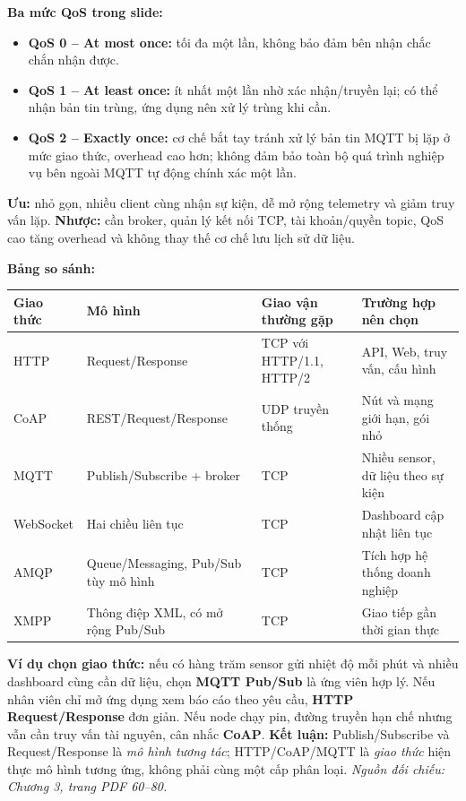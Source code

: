 \documentclass[12pt,a4paper]{article}
\newcommand{\nguon}[1]{{\small\itshape\color{navy}Nguồn đối chiếu: #1.}}
\begin{document}
\textbf{Ba mức QoS trong slide:}
\begin{itemize}
\item \textbf{QoS 0 -- At most once:} tối đa một lần, không bảo đảm bên nhận chắc chắn nhận được.
\item \textbf{QoS 1 -- At least once:} ít nhất một lần nhờ xác nhận/truyền lại; có thể nhận bản tin trùng, ứng dụng nên xử lý trùng khi cần.
\item \textbf{QoS 2 -- Exactly once:} cơ chế bắt tay tránh xử lý bản tin MQTT bị lặp ở mức giao thức, overhead cao hơn; không đảm bảo toàn bộ quá trình nghiệp vụ bên ngoài MQTT tự động chính xác một lần.
\end{itemize}
\textbf{Ưu:} nhỏ gọn, nhiều client cùng nhận sự kiện, dễ mở rộng telemetry và giảm truy vấn lặp. \textbf{Nhược:} cần broker, quản lý kết nối TCP, tài khoản/quyền topic, QoS cao tăng overhead và không thay thế cơ chế lưu lịch sử dữ liệu.

\textbf{Bảng so sánh:}
\begin{center}\footnotesize
\begin{tabularx}{\linewidth}{p{2cm}p{2.8cm}p{2.1cm}X}
\toprule
Giao thức & Mô hình & Giao vận thường gặp & Trường hợp nên chọn\\
\midrule
HTTP & Request/Response & TCP với HTTP/1.1, HTTP/2 & API, Web, truy vấn, cấu hình\\
CoAP & REST/Request/Response & UDP truyền thống & Nút và mạng giới hạn, gói nhỏ\\
MQTT & Publish/Subscribe + broker & TCP & Nhiều sensor, dữ liệu theo sự kiện\\
WebSocket & Hai chiều liên tục & TCP & Dashboard cập nhật liên tục\\
AMQP & Queue/Messaging, Pub/Sub tùy mô hình & TCP & Tích hợp hệ thống doanh nghiệp\\
XMPP & Thông điệp XML, có mở rộng Pub/Sub & TCP & Giao tiếp gần thời gian thực\\
\bottomrule
\end{tabularx}
\end{center}

\textbf{Ví dụ chọn giao thức:} nếu có hàng trăm sensor gửi nhiệt độ mỗi phút và nhiều dashboard cùng cần dữ liệu, chọn \textbf{MQTT Pub/Sub} là ứng viên hợp lý. Nếu nhân viên chỉ mở ứng dụng xem báo cáo theo yêu cầu, \textbf{HTTP Request/Response} đơn giản. Nếu node chạy pin, đường truyền hạn chế nhưng vẫn cần truy vấn tài nguyên, cân nhắc \textbf{CoAP}. \textbf{Kết luận:} Publish/Subscribe và Request/Response là \emph{mô hình tương tác}; HTTP/CoAP/MQTT là \emph{giao thức} hiện thực mô hình tương ứng, không phải cùng một cấp phân loại. \nguon{Chương 3, trang PDF 60--80}
\end{document}
